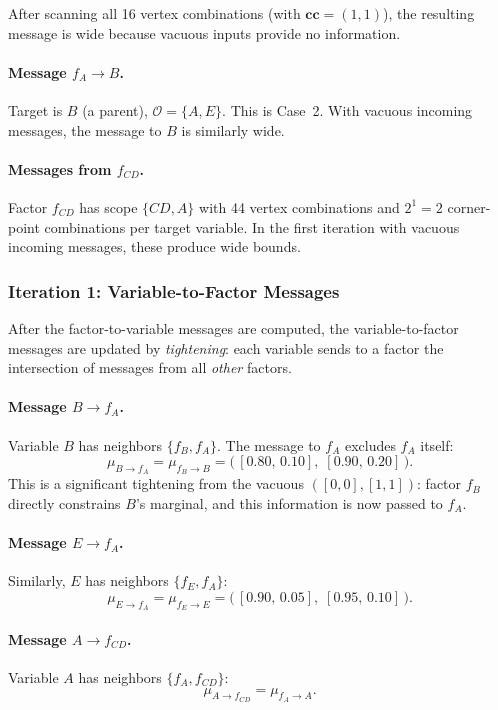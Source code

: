 \documentclass[11pt]{article}
\begin{document}
After scanning all 16 vertex combinations (with $\mathbf{cc} = (1,1)$),
the resulting message is wide because vacuous inputs provide no information.

\paragraph{Message $f_A \to B$.}
Target is $B$ (a parent), $\mathcal{O} = \{A, E\}$. This is Case~2.
With vacuous incoming messages, the message to $B$ is similarly wide.

\paragraph{Messages from $f_{CD}$.}
Factor $f_{CD}$ has scope $\{CD, A\}$ with 44 vertex combinations and $2^1 = 2$
corner-point combinations per target variable. In the first iteration with
vacuous incoming messages, these produce wide bounds.

\subsubsection{Iteration 1: Variable-to-Factor Messages}

After the factor-to-variable messages are computed, the variable-to-factor
messages are updated by \emph{tightening}: each variable sends to a factor
the intersection of messages from all \emph{other} factors.

\paragraph{Message $B \to f_A$.}
Variable $B$ has neighbors $\{f_B, f_A\}$. The message to $f_A$ excludes $f_A$ itself:
\[
  \mu_{B \to f_A} = \mu_{f_B \to B} = \bigl(\,[0.80,\, 0.10],\; [0.90,\, 0.20]\,\bigr).
\]
This is a significant tightening from the vacuous $([0,0],[1,1])$: factor $f_B$
directly constrains $B$'s marginal, and this information is now passed to $f_A$.

\paragraph{Message $E \to f_A$.}
Similarly, $E$ has neighbors $\{f_E, f_A\}$:
\[
  \mu_{E \to f_A} = \mu_{f_E \to E} = \bigl(\,[0.90,\, 0.05],\; [0.95,\, 0.10]\,\bigr).
\]

\paragraph{Message $A \to f_{CD}$.}
Variable $A$ has neighbors $\{f_A, f_{CD}\}$:
\[
  \mu_{A \to f_{CD}} = \mu_{f_A \to A}.
\]
\end{document}
